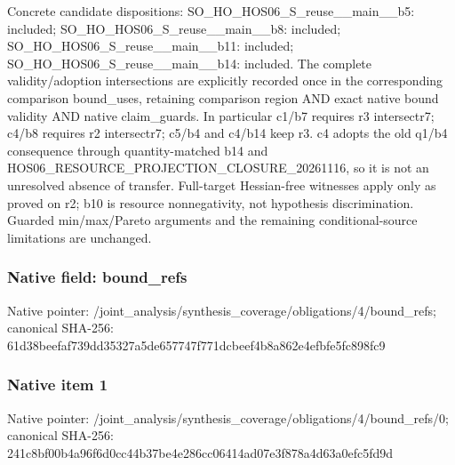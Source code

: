 \documentclass[10pt,a4paper]{article}
\begin{document}
\begingroup\raggedright\sloppy Concrete candidate dispositions:\allowbreak{} SO\_\allowbreak{}HO\_\allowbreak{}HOS06\_\allowbreak{}S\_\allowbreak{}reuse\_\allowbreak{}\_\allowbreak{}main\_\allowbreak{}\_\allowbreak{}b5:\allowbreak{} included;\allowbreak{} SO\_\allowbreak{}HO\_\allowbreak{}HOS06\_\allowbreak{}S\_\allowbreak{}reuse\_\allowbreak{}\_\allowbreak{}main\_\allowbreak{}\_\allowbreak{}b8:\allowbreak{} included;\allowbreak{} SO\_\allowbreak{}HO\_\allowbreak{}HOS06\_\allowbreak{}S\_\allowbreak{}reuse\_\allowbreak{}\_\allowbreak{}main\_\allowbreak{}\_\allowbreak{}b11:\allowbreak{} included;\allowbreak{} SO\_\allowbreak{}HO\_\allowbreak{}HOS06\_\allowbreak{}S\_\allowbreak{}reuse\_\allowbreak{}\_\allowbreak{}main\_\allowbreak{}\_\allowbreak{}b14:\allowbreak{} included. The complete validity/\allowbreak{}adoption intersections are explicitly recorded once in the corresponding comparison bound\_\allowbreak{}uses,\allowbreak{} retaining comparison region AND exact native bound validity AND native claim\_\allowbreak{}guards. In particular c1/\allowbreak{}b7 requires r3 intersectr7;\allowbreak{} c4/\allowbreak{}b8 requires r2 intersectr7;\allowbreak{} c5/\allowbreak{}b4 and c4/\allowbreak{}b14 keep r3. c4 adopts the old q1/\allowbreak{}b4 consequence through quantity-matched b14 and HOS06\_\allowbreak{}RESOURCE\_\allowbreak{}PROJECTION\_\allowbreak{}CLOSURE\_\allowbreak{}20261116,\allowbreak{} so it is not an unresolved absence of transfer. Full-target Hessian-free witnesses apply only as proved on r2;\allowbreak{} b10 is resource nonnegativity,\allowbreak{} not hypothesis discrimination. Guarded min/\allowbreak{}max/\allowbreak{}Pareto arguments and the remaining conditional-source limitations are unchanged.\par\endgroup

\subsubsection{Native field: bound\_\allowbreak{}refs}
Native pointer: /joint\_\allowbreak{}analysis/synthesis\_\allowbreak{}coverage/obligations/4/bound\_\allowbreak{}refs; canonical SHA-256: 61d38beefaf739dd35327a5de657747f771dcbeef4b8a862e4efbfe5fc898fc9

\subsubsection{Native item 1}
Native pointer: /joint\_\allowbreak{}analysis/synthesis\_\allowbreak{}coverage/obligations/4/bound\_\allowbreak{}refs/0; canonical SHA-256: 241c8bf00b4a96f6d0cc44b37be4e286cc06414ad07e3f878a4d63a0efc5fd9d
\end{document}
